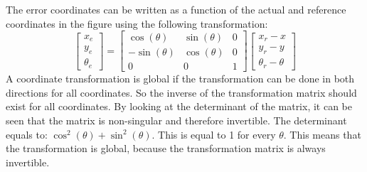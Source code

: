 The error coordinates can be written as a function of the actual and reference coordinates in the figure using the following transformation:
\begin{equation}
    \begin{bmatrix}
x_e\\ 
y_e\\
\theta_e

\end{bmatrix}
=
\begin{bmatrix}
\cos(\theta) & \sin(\theta)  & 0\\ 
-\sin(\theta) & \cos(\theta) & 0\\ 
0 & 0 & 1
\end{bmatrix}
\begin{bmatrix}
x_r - x\\
y_r - y\\
\theta_r - \theta 

\end{bmatrix}
\label{eq:ex1_error}
\end{equation}
A coordinate transformation is global if the transformation can be done in both directions for all coordinates. So the inverse of the transformation matrix should exist for all coordinates. By looking at the determinant of the matrix, it can be seen that the matrix is non-singular and therefore invertible. The determinant equals to: $\cos^2(\theta) + \sin^2(\theta)$. This is equal to 1 for every $\theta$. This means that the transformation is global, because the transformation matrix is always invertible. 

